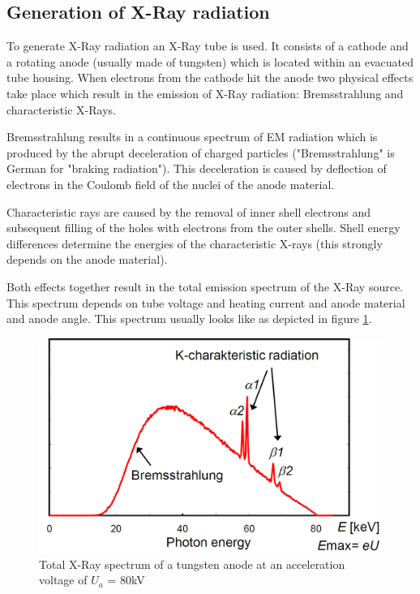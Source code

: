 \subsection{Generation of X-Ray radiation\cite{IIIP_3_1}}
\par To generate X-Ray radiation an X-Ray tube is used. It consists of a cathode and a rotating anode (usually made of tungsten) which is located within an evacuated tube housing. When electrons from the cathode hit the anode two physical effects take place which result in the emission of X-Ray radiation: Bremsstrahlung and characteristic X-Rays.
\par Bremsstrahlung results in a continuous spectrum of EM radiation which is produced by the abrupt deceleration of charged particles ("Bremsstrahlung" is German for "braking radiation"). This deceleration is caused by deflection of electrons in the Coulomb field of the nuclei of the anode material.
\par Characteristic rays are caused by the removal of inner shell electrons and subsequent filling of the holes with electrons from the outer shells. Shell energy differences determine the energies of the characteristic X-rays (this strongly depends on the anode material).
\par Both effects together result in the total emission spectrum of the X-Ray source. This spectrum depends on tube voltage and heating current and anode material and anode angle. This spectrum usually looks like as depicted in figure \ref{spectrum}.
\begin{figure}[h!]
	\centering
	\includegraphics[width=0.9\linewidth]{images/spectrum.png}
	\caption{Total X-Ray spectrum of a tungsten anode at an acceleration voltage of \(U_a\) = 80kV\cite{IIIP_3_1}}
	\label{spectrum}
\end{figure}
